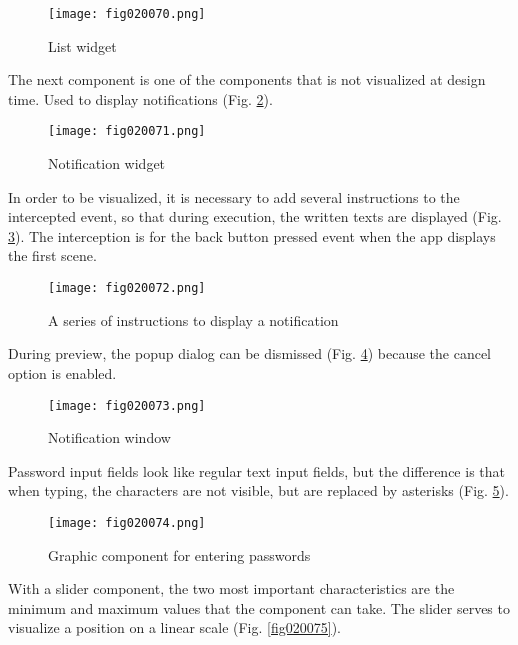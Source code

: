 \begin{figure}[H]
   \centering
   \texttt{[image: fig020070.png]}
   \caption{List widget}
\label{fig020070}
\end{figure}

The next component is one of the components that is not visualized at design time. Used to display notifications (Fig. \ref{fig020071}).

\begin{figure}[H]
   \centering
   \texttt{[image: fig020071.png]}
   \caption{Notification widget}
\label{fig020071}
\end{figure}

In order to be visualized, it is necessary to add several instructions to the intercepted event, so that during execution, the written texts are displayed (Fig. \ref{fig020072}). The interception is for the back button pressed event when the app displays the first scene.

\begin{figure}[H]
   \centering
   \texttt{[image: fig020072.png]}
   \caption{A series of instructions to display a notification}
\label{fig020072}
\end{figure}

During preview, the popup dialog can be dismissed (Fig. \ref{fig020073}) because the cancel option is enabled.

\begin{figure}[H]
   \centering
   \texttt{[image: fig020073.png]}
   \caption{Notification window}
\label{fig020073}
\end{figure}

Password input fields look like regular text input fields, but the difference is that when typing, the characters are not visible, but are replaced by asterisks (Fig. \ref{fig020074}).

\begin{figure}[H]
   \centering
   \texttt{[image: fig020074.png]}
   \caption{Graphic component for entering passwords}
\label{fig020074}
\end{figure}

With a slider component, the two most important characteristics are the minimum and maximum values that the component can take. The slider serves to visualize a position on a linear scale (Fig. \ref{fig020075}).

